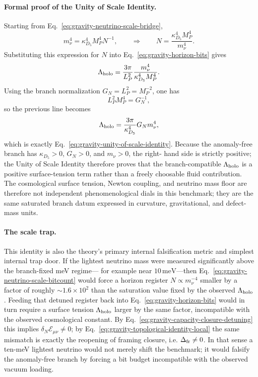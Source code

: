 \documentclass[11pt]{article}
\begin{document}
\paragraph{Formal proof of the Unity of Scale Identity.}
Starting from Eq.~\eqref{eq:gravity-neutrino-scale-bridge},
\begin{equation}
 m_{\nu}^4
 =
 \kappa_{D_5}^4 M_P^4 N^{-1},
 \qquad\Longrightarrow\qquad
 N
 =
 \frac{\kappa_{D_5}^4 M_P^4}{m_{\nu}^4}.
\end{equation}
Substituting this expression for $N$ into Eq.~\eqref{eq:gravity-horizon-bits}
gives
\begin{equation}
 \Lambda_{\rm holo}
 =
 \frac{3\pi}{L_P^2}
 \frac{m_{\nu}^4}{\kappa_{D_5}^4 M_P^4}.
\end{equation}
Using the branch normalization $G_N=L_P^2=M_P^{-2}$, one has
\begin{equation}
 L_P^2 M_P^4 = G_N^{-1},
\end{equation}
so the previous line becomes
\begin{equation}
 \Lambda_{\rm holo}
 =
 \frac{3\pi}{\kappa_{D_5}^4}
 G_N m_{\nu}^4,
\end{equation}
which is exactly Eq.~\eqref{eq:gravity-unity-of-scale-identity}. Because the
anomaly-free branch has $\kappa_{D_5}>0$, $G_N>0$, and $m_{\nu}>0$, the right-
hand side is strictly positive; the Unity of Scale Identity therefore proves
that the branch-compatible $\Lambda_{\rm holo}$ is a positive surface-tension
term rather than a freely choosable fluid contribution.
The cosmological surface tension, Newton coupling, and neutrino mass floor are
therefore not independent phenomenological dials in this benchmark; they are
the same saturated branch datum expressed in curvature, gravitational, and
defect-mass units.

\paragraph{The scale trap.}
This identity is also the theory's primary internal falsification metric and
simplest internal trap door. If the lightest
neutrino mass were measured significantly above the branch-fixed meV regime---
for example near $10\,\mathrm{meV}$---then
Eq.~\eqref{eq:gravity-neutrino-scale-bitcount} would force a horizon register
$N\propto m_{\nu}^{-4}$ smaller by a factor of roughly
$\sim1.6\times10^2$ than the saturation value fixed by the observed
$\Lambda_{\rm holo}$. Feeding that detuned register back into
Eq.~\eqref{eq:gravity-horizon-bits} would in turn require a surface tension
$\Lambda_{\rm holo}$ larger by the same factor, incompatible with the observed
cosmological constant. By Eq.~\eqref{eq:gravity-capacity-closure-detuning}
this implies $\delta_N\mathcal E_{\mu\nu}\neq0$; by
Eq.~\eqref{eq:gravity-topological-identity-local} the same mismatch is exactly
the reopening of framing closure, i.e. $\Delta_{\rm fr}\neq0$. In that sense a
ten-meV lightest neutrino would not merely shift the benchmark; it would
falsify the anomaly-free branch by forcing a bit budget incompatible with the
observed vacuum loading.
\end{document}
